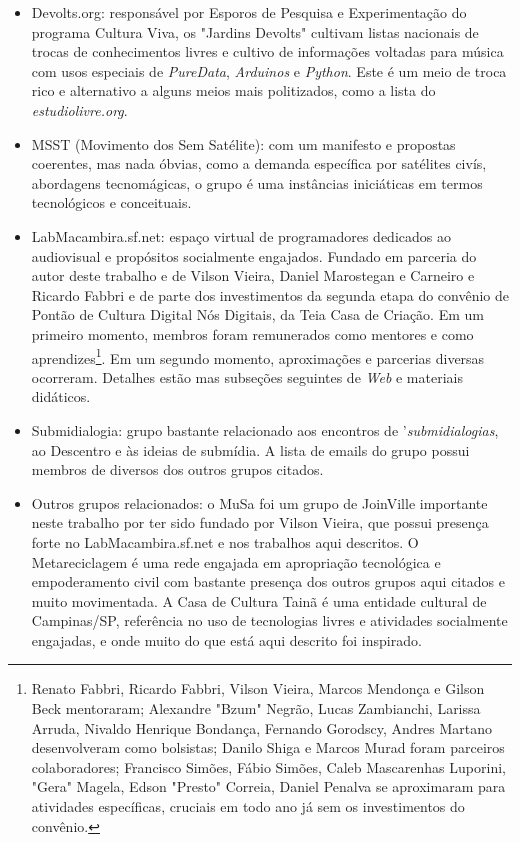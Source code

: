 \begin{itemize}
    \item Devolts.org: responsável por Esporos de Pesquisa e Experimentação do programa Cultura Viva, os "Jardins Devolts" cultivam listas nacionais de trocas de conhecimentos livres e cultivo de informações voltadas para música com usos especiais de \emph{PureData}, \emph{Arduinos} e \emph{Python}. Este é um meio de troca rico e alternativo a alguns meios mais politizados, como a lista do \emph{estudiolivre.org}.
    \item MSST (Movimento dos Sem Satélite): com um manifesto e propostas coerentes, mas nada óbvias, como a demanda específica por satélites civís, abordagens tecnomágicas, o grupo é uma instâncias iniciáticas em termos tecnológicos e conceituais.
    \item LabMacambira.sf.net: espaço virtual de programadores dedicados ao audiovisual e propósitos socialmente engajados. Fundado em parceria do autor deste trabalho e de Vilson Vieira, Daniel Marostegan e Carneiro e Ricardo Fabbri e de parte dos investimentos da segunda etapa do convênio de Pontão de Cultura Digital Nós Digitais, da Teia Casa de Criação. Em um primeiro momento, membros foram remunerados como mentores e como aprendizes\footnote{Renato Fabbri, Ricardo Fabbri, Vilson Vieira, Marcos Mendonça e Gilson Beck mentoraram; Alexandre "Bzum" Negrão, Lucas Zambianchi, Larissa Arruda, Nivaldo Henrique Bondança, Fernando Gorodscy, Andres Martano desenvolveram como bolsistas; Danilo Shiga e Marcos Murad foram parceiros colaboradores; Francisco Simões, Fábio Simões, Caleb Mascarenhas Luporini, "Gera" Magela, Edson "Presto" Correia, Daniel Penalva se aproximaram para atividades específicas, cruciais em todo ano já sem os investimentos do convênio.}. Em um segundo momento, aproximações e parcerias diversas ocorreram. Detalhes estão mas subseções seguintes de \emph{Web} e materiais didáticos.
    \item Submidialogia: grupo bastante relacionado aos encontros de '\emph{submidialogias}, ao Descentro e às ideias de submídia. A lista de emails do grupo possui membros de diversos dos outros grupos citados.
    \item Outros grupos relacionados: o MuSa foi um grupo de JoinVille importante neste trabalho por ter sido fundado por Vilson Vieira, que possui presença forte no LabMacambira.sf.net e nos trabalhos aqui descritos. O  Metareciclagem é uma rede engajada em apropriação tecnológica e empoderamento civil com bastante presença dos outros grupos aqui citados e muito movimentada. A Casa de Cultura Tainã é uma entidade cultural de Campinas/SP, referência no uso de tecnologias livres e atividades socialmente engajadas, e onde muito do que está aqui descrito foi inspirado.
\end{itemize}



